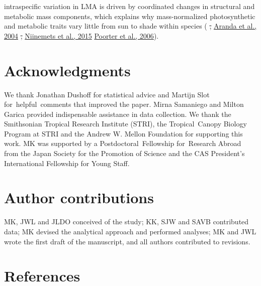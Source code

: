 \documentclass[
  12pt,
  a4paper,
,tablecaptionabove
]{scrartcl}
\providecommand{\DIFaddtex}[1]{{\protect\color{blue}\uwave{#1}}} %
\providecommand{\DIFdeltex}[1]{{\protect\color{red}\sout{#1}}}                      %
\providecommand{\DIFaddbegin}{} %
\providecommand{\DIFaddend}{} %
\providecommand{\DIFdelbegin}{} %
\providecommand{\DIFdelend}{} %
\providecommand{\DIFadd}[1]{\texorpdfstring{\DIFaddtex{#1}}{#1}} %
\providecommand{\DIFdel}[1]{\texorpdfstring{\DIFdeltex{#1}}{}} %
\newcommand{\DIFscaledelfig}{0.5}
\newlength{\DIFdelgraphicswidth} %
\newlength{\DIFdelgraphicsheight} %
\newcommand{\DIFaddincludegraphics}[2][]{{\color{blue}\fbox{\DIFOincludegraphics[#1]{#2}}}} %
\newcommand{\DIFdelincludegraphics}[2][]{%
\sbox{\DIFdelgraphicsbox}{\DIFOincludegraphics[#1]{#2}}%
\settoboxwidth{\DIFdelgraphicswidth}{\DIFdelgraphicsbox} %
\settoboxtotalheight{\DIFdelgraphicsheight}{\DIFdelgraphicsbox} %
\scalebox{\DIFscaledelfig}{%
\parbox[b]{\DIFdelgraphicswidth}{\usebox{\DIFdelgraphicsbox}\\[-\baselineskip] \rule{\DIFdelgraphicswidth}{0em}}\llap{\resizebox{\DIFdelgraphicswidth}{\DIFdelgraphicsheight}{%
\setlength{\unitlength}{\DIFdelgraphicswidth}%
\begin{picture}(1,1)%
\thicklines\linethickness{2pt} %
{\color[rgb]{1,0,0}\put(0,0){\framebox(1,1){}}}%
{\color[rgb]{1,0,0}\put(0,0){\line( 1,1){1}}}%
{\color[rgb]{1,0,0}\put(0,1){\line(1,-1){1}}}%
\end{picture}%
}\hspace*{3pt}}} %
} %
\DeclareRobustCommand{\DIFaddbegin}{\DIFOaddbegin \let\includegraphics\DIFaddincludegraphics} %
\DeclareRobustCommand{\DIFaddend}{\DIFOaddend \let\includegraphics\DIFOincludegraphics} %
\DeclareRobustCommand{\DIFdelbegin}{\DIFOdelbegin \let\includegraphics\DIFdelincludegraphics} %
\DeclareRobustCommand{\DIFdelend}{\DIFOaddend \let\includegraphics\DIFOincludegraphics} %
\begin{document}
intraspecific variation in LMA is driven by coordinated changes in
structural and metabolic mass components, which explains why
mass-normalized photosynthetic and metabolic traits vary little from sun
to shade within species (\protect\DIFdelbegin %
\DIFdel{, }\DIFdelend \DIFaddbegin \hyperlink{ref-Aranda2004}{Aranda et
al., 2004}\DIFadd{; }\DIFaddend \protect\DIFdelbegin %
\DIFdel{,
}\DIFdelend \DIFaddbegin \hyperlink{ref-Niinemets2015}{Niinemets et al.,
2015}\DIFadd{; }\DIFaddend \protect\DIFdelbegin %
\DIFdelend \DIFaddbegin \hyperlink{ref-Poorter2006b}{Poorter et al., 2006}\DIFaddend ).

\hypertarget{acknowledgments}{%
\section{Acknowledgments}\label{acknowledgments}}

We thank Jonathan Dushoff for statistical advice and Martijn Slot
for~helpful~comments that improved the paper. Mirna Samaniego and Milton
Garica provided indispensable assistance in data collection. We thank
the Smithsonian Tropical Research Institute (STRI), the Tropical~Canopy
Biology Program at STRI and the Andrew W. Mellon Foundation for
supporting this work. MK was supported by a Postdoctoral~Fellowship
for~Research Abroad from the Japan Society for the Promotion of Science
and the CAS President's International Fellowship for Young Staff.

\hypertarget{author-contributions}{%
\section{Author contributions}\label{author-contributions}}

MK, JWL and JLDO conceived of the study; KK, SJW and SAVB contributed
data; MK devised the analytical approach and performed analyses; MK and
JWL wrote the first draft of the manuscript, and all authors contributed
to revisions.

\hypertarget{references}{%
\section{References}\label{references}}
\end{document}
